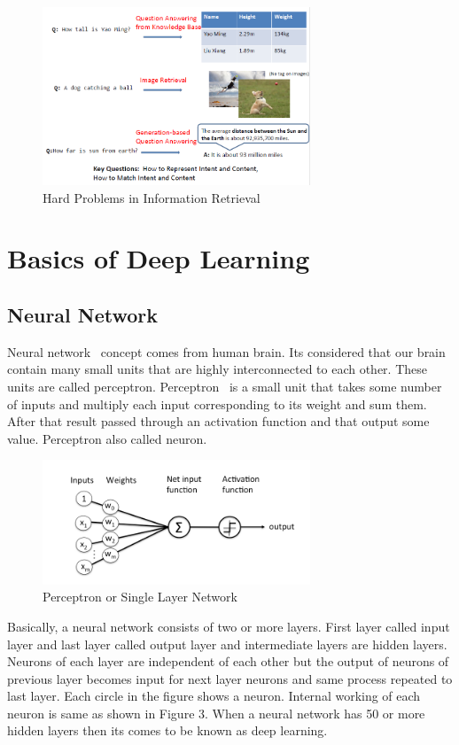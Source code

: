 \documentclass{doublecol-new}
\theoremstyle{TH}{
\newtheorem{lemma}{Lemma}
\newtheorem{theorem}[lemma]{Theorem}
\newtheorem{corrolary}[lemma]{Corrolary}
\newtheorem{conjecture}[lemma]{Conjecture}
\newtheorem{proposition}[lemma]{Proposition}
\newtheorem{claim}[lemma]{Claim}
\newtheorem{stheorem}[lemma]{Wrong Theorem}
\newtheorem{algorithm}{Algorithm}
}
\theoremstyle{THrm}{
\newtheorem{definition}{Definition}[section]
\newtheorem{question}{Question}[section]
\newtheorem{remark}{Remark}
\newtheorem{scheme}{Scheme}
}
\theoremstyle{THhit}{
\newtheorem{case}{Case}[section]
}
\begin{document}
\begin{figure}[h]
	\centerline{\includegraphics[width=8cm,keepaspectratio]{image/hard_problem_IR.PNG}}
	\label{fig:Hard Problems in Information Retrieval}
	\caption{Hard Problems in Information Retrieval}
\end{figure}



\section{Basics of Deep Learning} \label{sec:deeplearningoverview}

\subsection{Neural Network}
Neural network~\cite{8540494} concept comes from human brain. Its considered that our brain contain many small units that are highly interconnected to each other. These units are called perceptron. Perceptron~\cite{ramchoun2016multilayer} is a small unit that takes some number of inputs and multiply each input corresponding to its weight and sum them. After that result passed through an activation function and that output some value. Perceptron also called neuron. 


\begin{figure}[h]
	\centerline{\includegraphics[width=8cm,keepaspectratio]{image/perceptron.PNG}}
	\label{fig:Percptron}
	\caption{Perceptron or Single Layer Network}
\end{figure}

Basically, a neural network consists of two or more layers. First layer called input layer and last layer called output layer and intermediate layers are hidden layers. Neurons of each layer are independent of each other but the output of neurons of previous layer becomes input for next layer neurons and same process repeated to last layer. Each circle in the figure shows a neuron. Internal working of each neuron is same as shown in Figure 3. When a neural network has 50  or more hidden layers then its comes to be known as deep learning.  
\end{document}
